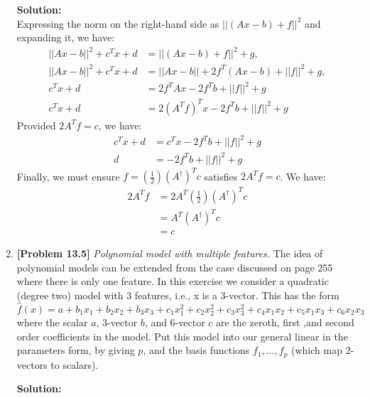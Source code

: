 \begin{enumerate}[label=(\alph*)]
	      \begin{tcolorbox}
		      \textbf{Solution:} \\
		      Expressing the norm on the right-hand side as $||(Ax - b) + f||^2$
		      and expanding it, we have:
		      $$ \begin{aligned}
				      ||Ax - b||^2 + c^Tx + d & = ||(Ax - b) + f ||^2 + g,
				      \\
				      ||Ax - b||^2 + c^Tx + d & = ||Ax - b|| + 2f^T(Ax - b) +
				      ||f||^2 + g,                                                 \\
				      c^Tx + d                & = 2f^TAx - 2f^Tb + ||f||^2 + g
				      \\
				      c^Tx + d                & = 2(A^Tf)^Tx - 2f^Tb + ||f||^2 + g
			      \end{aligned}$$
		      Provided $2A^Tf = c$, we have:
		      $$ \begin{aligned}
				      c^Tx + d & = c^Tx - 2f^Tb + ||f||^2 + g \\
				      d        & = -2f^Tb + ||f||^2 + g
			      \end{aligned}$$
		      Finally, we must ensure $f = (\frac{1}{2})(A^\dagger)^T c$
		      satisfies $2A^Tf = c$. We have:
		      $$ \begin{aligned}
				      2A^Tf & = 2A^T(\frac{1}{2})(A^\dagger)^T c \\
				            & = A^T(A^\dagger)^T c               \\
				            & = c
			      \end{aligned}$$
	      \end{tcolorbox}
	\item \textbf{[Problem 13.5]} \textit{Polynomial model with multiple
		      features.} The idea of polynomial models can be extended from the case
	      discussed on page 255 where there is only one feature. In this
	      exercise we consider a quadratic (degree two) model with 3 features,
	      i.e., x is a 3-vector. This has the form
	      $$ \hat{f}(x) = a + b_1x_1 + b_2x_2 + b_3x_3 + c_1x_1^2 + c_2x_2^2 +
		      c_3x_3^2 + c_4x_1x_2 + c_5x_1x_3 + c_6x_2x_3 $$
	      where the scalar $a$, 3-vector $b$, and 6-vector $c$ are the
	      zeroth, first ,and second order coefficients in the model. Put
	      this model into our general linear in the parameters form, by
	      giving $p$, and
	      the basis functions $f_1, \dots, f_p$ (which map 2-vectors to
	      scalars).
	      \begin{tcolorbox}
		      \textbf{Solution:}\\

\end{tcolorbox}
\end{enumerate}
